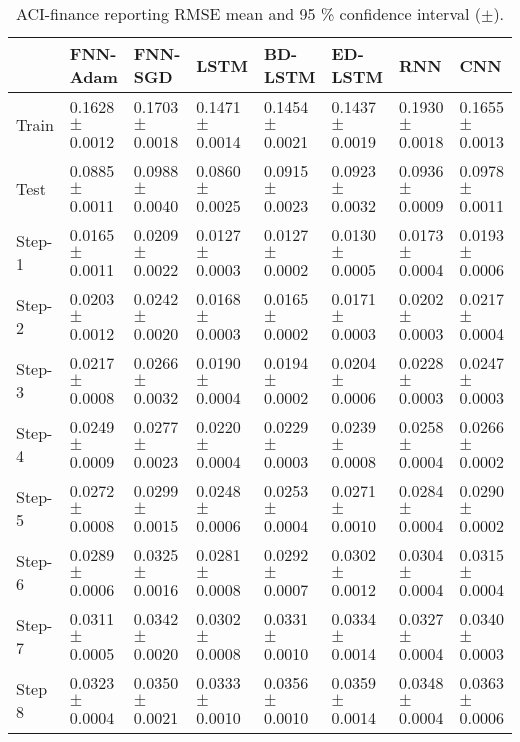 \documentclass{ieeeaccess}
\begin{document}
\begin{table*}[htbp]
 \smaller 
 \caption{ACI-finance reporting RMSE mean and 95 \% confidence interval   ($\pm$).}
\label{tab:finance}
\begin{tabular}{llllllll}
\hline
 &  FNN-Adam& FNN-SGD & LSTM & BD-LSTM  & ED-LSTM & RNN & CNN\\
\hline
\hline
Train &  0.1628 $\pm$  0.0012 & 0.1703 $\pm$   0.0018  & 0.1471 $\pm$   0.0014  &  0.1454 $\pm$  0.0021 &  0.1437 $\pm$  0.0019  &  0.1930 $\pm$  0.0018   & 0.1655	$\pm$0.0013\\
 Test &   0.0885 $\pm$  0.0011 & 0.0988 $\pm$   0.0040  & 0.0860 $\pm$   0.0025  &  0.0915 $\pm$  0.0023 & 0.0923 $\pm$  0.0032  & 0.0936 $\pm$  0.0009 & 0.0978$\pm$	0.0011\\
Step-1 &  0.0165 $\pm$  0.0011 & 0.0209 $\pm$  0.0022  & 0.0127 $\pm$  0.0003  &  0.0127 $\pm$ 0.0002 &  0.0130 $\pm$  0.0005  &  0.0173 $\pm$  0.0004  & 0.0193$\pm$	0.0006\\
Step-2 &  0.0203 $\pm$  0.0012 & 0.0242 $\pm$   0.0020  & 0.0168 $\pm$   0.0003  &  0.0165 $\pm$  0.0002 &  0.0171 $\pm$  0.0003  &  0.0202 $\pm$  0.0003   &0.0217	$\pm$0.0004\\
Step-3 &  0.0217 $\pm$  0.0008 & 0.0266 $\pm$   0.0032  & 0.0190 $\pm$   0.0004  &  0.0194 $\pm$  0.0002 &  0.0204 $\pm$  0.0006  &  0.0228 $\pm$  0.0003 & 0.0247$\pm$	0.0003 \\
Step-4 &  0.0249 $\pm$ 0.0009 & 0.0277 $\pm$   0.0023  & 0.0220 $\pm$  0.0004  &  0.0229 $\pm$  0.0003 & 0.0239 $\pm$  0.0008  &  0.0258 $\pm$  0.0004  &0.0266$\pm$	0.0002 \\


Step-5 &  0.0272 $\pm$  0.0008 & 0.0299 $\pm$   0.0015  & 0.0248 $\pm$   0.0006  &  0.0253 $\pm$  0.0004 &  0.0271 $\pm$ 0.0010  &  0.0284 $\pm$ 0.0004 & 0.0290	$\pm$0.0002 \\

Step-6 &  0.0289 $\pm$ 0.0006 & 0.0325 $\pm$   0.0016  & 0.0281 $\pm$  0.0008 & 0.0292 $\pm$  0.0007 &  0.0302 $\pm$  0.0012  &  0.0304 $\pm$  0.0004 & 0.0315	$\pm$0.0004 \\

Step-7 & 0.0311 $\pm$  0.0005 & 0.0342 $\pm$   0.0020  & 0.0302 $\pm$   0.0008  &  0.0331 $\pm$  0.0010 &  0.0334 $\pm$  0.0014  &  0.0327 $\pm$  0.0004 & 0.0340$\pm$	0.0003 \\

Step 8 &  0.0323 $\pm$  0.0004 & 0.0350 $\pm$  0.0021  & 0.0333 $\pm$  0.0010  &  0.0356 $\pm$ 0.0010 &  0.0359 $\pm$  0.0014  &  0.0348 $\pm$ 0.0004  & 0.0363	$\pm$0.0006 \\


\end{tabular}
\end{table*}
\end{document}
